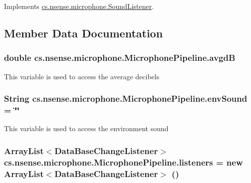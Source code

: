 Implements \hyperlink{interfacecs_1_1nsense_1_1microphone_1_1_sound_listener_a4805f7c35514efbcb6ee9b756d1aab35}{cs.\-nsense.\-microphone.\-Sound\-Listener}.



\subsection{Member Data Documentation}
\hypertarget{classcs_1_1nsense_1_1microphone_1_1_microphone_pipeline_a26ed15d758ad9baf9818b32da84c2983}{
\subsubsection[{avgd\-B}]{\setlength{\rightskip}{0pt plus 5cm}double cs.\-nsense.\-microphone.\-Microphone\-Pipeline.\-avgd\-B\hspace{0.3cm}{\ttfamily [protected]}}}\label{classcs_1_1nsense_1_1microphone_1_1_microphone_pipeline_a26ed15d758ad9baf9818b32da84c2983}
This variable is used to access the average decibels \hypertarget{classcs_1_1nsense_1_1microphone_1_1_microphone_pipeline_adc2543723923db8f92bce32562db8439}{
\subsubsection[{env\-Sound}]{\setlength{\rightskip}{0pt plus 5cm}String cs.\-nsense.\-microphone.\-Microphone\-Pipeline.\-env\-Sound = \char`\"{}\char`\"{}\hspace{0.3cm}{\ttfamily [private]}}}\label{classcs_1_1nsense_1_1microphone_1_1_microphone_pipeline_adc2543723923db8f92bce32562db8439}
This variable is used to access the environment sound \hypertarget{classcs_1_1nsense_1_1microphone_1_1_microphone_pipeline_a803c737599414c167d0e32fe9b74e08e}{
\subsubsection[{listeners}]{\setlength{\rightskip}{0pt plus 5cm}Array\-List$<${\bf Data\-Base\-Change\-Listener}$>$ cs.\-nsense.\-microphone.\-Microphone\-Pipeline.\-listeners = new Array\-List$<${\bf Data\-Base\-Change\-Listener}$>$ ()\hspace{0.3cm}{\ttfamily [private]}}}\label{classcs_1_1nsense_1_1microphone_1_1_microphone_pipeline_a803c737599414c167d0e32fe9b74e08e}
